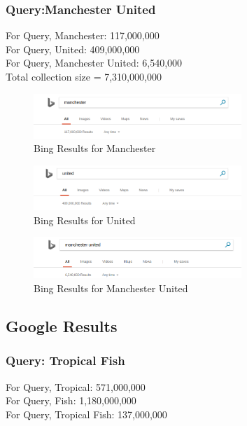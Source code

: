 \documentclass[12pt]{report}
\begin{document}
\subsubsection{Query:Manchester United}
For Query, Manchester: 117,000,000\\
For Query, United: 409,000,000\\
For Query, Manchester United: 6,540,000\\

Total collection size = 7,310,000,000\\

\begin{figure}[ht] 
  \centering
  \includegraphics[width=0.7\textwidth]{Bing_manchester.png}
  \caption{Bing Results for Manchester}
  \label{fig:16}
\end{figure}

\begin{figure}[ht] 
  \centering
  \includegraphics[width=0.7\textwidth]{Bing_united.png}
  \caption{Bing Results for United}
  \label{fig:17}
\end{figure}

\begin{figure}[ht] 
  \centering
  \includegraphics[width=0.7\textwidth]{Bing_manchesterunited.png}
  \caption{Bing Results for Manchester United}
  \label{fig:18}
\end{figure}

\subsection{Google Results}
\subsubsection{Query: Tropical Fish}
For Query, Tropical: 571,000,000\\
For Query, Fish: 1,180,000,000\\
For Query, Tropical Fish: 137,000,000\\
\end{document}
